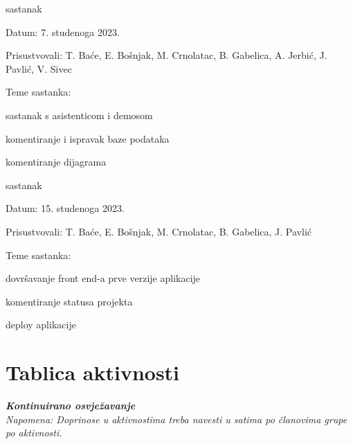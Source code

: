 \begin{packed_enum}
			\item  sastanak
			\item[] \begin{packed_item}
				\item Datum: 7. studenoga 2023.
				\item Prisustvovali: T. Baće, E. Bošnjak, M. Crnolatac, B. Gabelica, A. Jerbić, J. Pavlić, V. Sivec
				\item Teme sastanka:
				\begin{packed_item}
					\item  sastanak s asistenticom i demosom
					\item  komentiranje i ispravak baze podataka
					\item  komentiranje dijagrama
				\end{packed_item}
			\end{packed_item}
			
			\item  sastanak
			\item[] \begin{packed_item}
				\item Datum: 15. studenoga 2023.
				\item Prisustvovali: T. Baće, E. Bošnjak, M. Crnolatac, B. Gabelica, J. Pavlić
				\item Teme sastanka:
				\begin{packed_item}
					\item  dovršavanje front end-a prve verzije aplikacije
					\item  komentiranje statusa projekta
					\item  deploy aplikacije
				\end{packed_item}
			\end{packed_item}
			
		\end{packed_enum}
		
		\eject
		\section*{Tablica aktivnosti}
		
			\textbf{\textit{Kontinuirano osvježavanje}}\\
			
			 \textit{Napomena: Doprinose u aktivnostima treba navesti u satima po članovima grupe po aktivnosti.}

